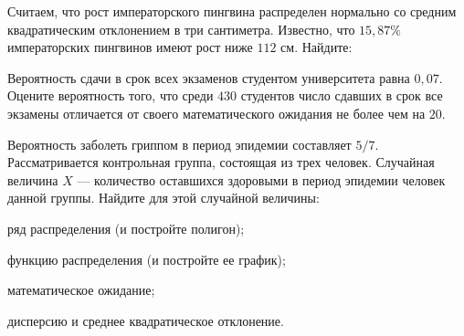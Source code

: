 \vfil

\begin{zkrPlain}{25}\noindent 
	Считаем, что рост императорского пингвина распределен нормально со средним квадратическим отклонением в три сантиметра. Известно, что $15{,}87\%$ императорских пингвинов имеют рост ниже $112$ см. Найдите: \par {}
 
\end{zkrPlain}

\vfil

\begin{zkrPlain}{25}\noindent 
	Вероятность сдачи в срок всех экзаменов студентом университета равна $ 0{,}07 $. Оцените вероятность того, что среди $ 430 $ студентов число сдавших в срок все экзамены отличается от своего математического ожидания не более чем на $ 20 $. 
 
\end{zkrPlain}

\newpage\setcounter{zad}{0}\setcounter{footnote}{0}



\begin{zkrPlain}{25}\noindent 
	Вероятность заболеть гриппом в период эпидемии составляет $5/7$. Рассматривается контрольная группа, состоящая из трех человек. Случайная величина $X$ --- количество оставшихся здоровыми в период эпидемии человек данной группы.  Найдите для этой случайной величины: \par \smallskip\small{ \par \zz ряд распределения (и постройте полигон); \par \zz функцию распределения (и постройте ее график); \par \zz математическое ожидание; \par \zz дисперсию и среднее квадратическое отклонение.\par \par}
 
\end{zkrPlain}

\vfil

